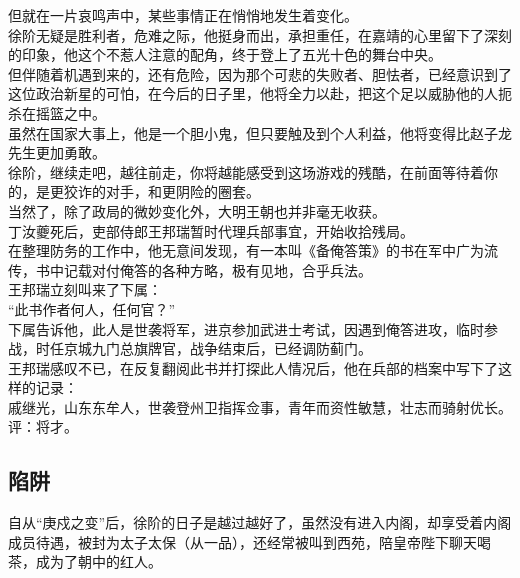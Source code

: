 \begin{multicols}{\theparacolNo}
但就在一片哀鸣声中，某些事情正在悄悄地发生着变化。\\

徐阶无疑是胜利者，危难之际，他挺身而出，承担重任，在嘉靖的心里留下了深刻的印象，他这个不惹人注意的配角，终于登上了五光十色的舞台中央。\\

但伴随着机遇到来的，还有危险，因为那个可悲的失败者、胆怯者，已经意识到了这位政治新星的可怕，在今后的日子里，他将全力以赴，把这个足以威胁他的人扼杀在摇篮之中。\\

虽然在国家大事上，他是一个胆小鬼，但只要触及到个人利益，他将变得比赵子龙先生更加勇敢。\\

徐阶，继续走吧，越往前走，你将越能感受到这场游戏的残酷，在前面等待着你的，是更狡诈的对手，和更阴险的圈套。\\

当然了，除了政局的微妙变化外，大明王朝也并非毫无收获。\\

丁汝夔死后，吏部侍郎王邦瑞暂时代理兵部事宜，开始收拾残局。\\

在整理防务的工作中，他无意间发现，有一本叫《备俺答策》的书在军中广为流传，书中记载对付俺答的各种方略，极有见地，合乎兵法。\\

王邦瑞立刻叫来了下属：\\

“此书作者何人，任何官？”\\

下属告诉他，此人是世袭将军，进京参加武进士考试，因遇到俺答进攻，临时参战，时任京城九门总旗牌官，战争结束后，已经调防蓟门。\\

王邦瑞感叹不已，在反复翻阅此书并打探此人情况后，他在兵部的档案中写下了这样的记录：\\

戚继光，山东东牟人，世袭登州卫指挥佥事，青年而资性敏慧，壮志而骑射优长。评：将才。\\

\subsection{陷阱}
自从“庚戍之变”后，徐阶的日子是越过越好了，虽然没有进入内阁，却享受着内阁成员待遇，被封为太子太保（从一品），还经常被叫到西苑，陪皇帝陛下聊天喝茶，成为了朝中的红人。\\


\end{multicols}
